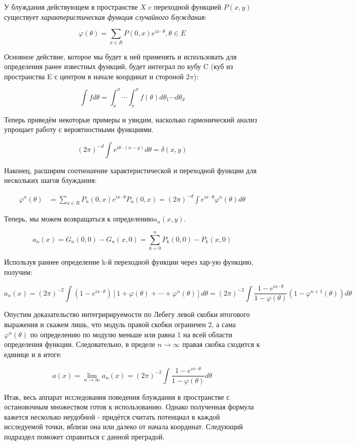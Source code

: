 У блуждания действующем в пространстве $X$ c переходной функцией $P(x,y)$ существует \textit{характеристическая функция случайного блуждания}:

\[ \varphi(\theta) = \sum_{x \in R} P(0,x) e^{i x \cdot \theta}, \theta \in E \]

Основное действие, которое мы будет к ней применять и использовать для определения ранее известных функций, будет интеграл по кубу C (куб из пространства E 
с центром в начале координат и стороной $2\pi$):

\[ \int f d\theta = \int^\pi_\pi \cdots \int^\pi_\pi f(\theta) d\theta_1 \cdots d\theta_d \]

Теперь приведём некоторые примеры и увидим, насколько гармонический анализ упрощает работу с вероятностными функциями.

\[ (2\pi)^{-d} \int e^{i\theta \cdot (x-y)} d\theta = \delta(x,y) \]

Наконец, расширим соотношение характеристической и переходной функции для нескольких шагов блуждания:

\begin{align*}
\varphi^n(\theta) &= \sum_{x \in R} P_n(0,x) e^{i x \cdot \theta}
P_n(0,x) = (2\pi)^{-d} \int e^{i x\cdot \theta } \varphi^n(\theta) d\theta
\end{align*}

Теперь, мы можем возвращаться к определению$a_n(x,y)$.

\[ a_n(x) = G_n(0,0) - G_n(x,0) = \sum_{k=0}^{n} P_k(0,0) - P_k(x,0) \]

Используя раннее определение k-й переходной функции через хар-ую функцию, получим:

\[ a_n(x) = (2\pi)^{-2} \int (1 - e^{i x\cdot \theta }) [1 + \varphi(\theta) + \cdots + \varphi^n(\theta)] d\theta = (2\pi)^{-2} \int \frac{1 - e^{i x\cdot \theta }}{1 - \varphi(\theta)} (1 - \varphi^{n+1}(\theta))d\theta \]

Опустим доказательство интегририруемости по Лебегу левой скобки итогового выражения и скажем лишь, что модуль правой скобки ограничен 2, а сама $\varphi^n(\theta)$ по определению по модулю меньше или равна 1 на всей области определения функции. Следовательно, в пределе $n \to \infty$ правая скобка сходится к единице и в итоге:

\[ a(x) = \lim_{n \to \infty} a_n(x) =  (2\pi)^{-2} \int \frac{1 - e^{i x\cdot \theta }}{1 - \varphi(\theta)}d\theta \]

Итак, весь аппарат исследования поведения блуждания в пространстве с остановочным множеством готов к использованию. Однако полученная формула кажется несколько
неудобной - придётся считать потенциал в каждой исследуемой точки, вблизи она или далеко от начала координат. Следующий подраздел поможет справиться с данной преградой.

